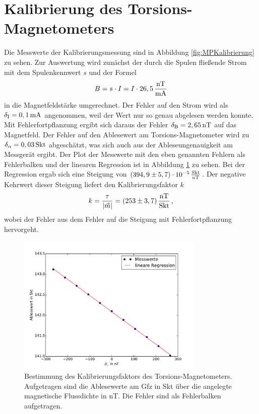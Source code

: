 \section{Kalibrierung des Torsions-Magnetometers}

Die Messwerte der Kalibrierungsmessung sind in Abbildung \ref{fig:MPKalibrierung} zu sehen. Zur Auswertung wird zunächst der durch die Spulen fließende Strom mit dem Spulenkennwert $s$ und der Formel
\begin{equation}
 B=s\cdot I=I\cdot 26,5\,\frac{\mathrm{nT}}{\mathrm{mA}} 
\end{equation}
in die Magnetfeldstärke umgerechnet. Der Fehler auf den Strom wird als $\delta_{\mathrm{I}}=0,1\,\mathrm{mA}$ angenommen, weil der Wert nur so genau abgelesen werden konnte. Mit Fehlerfortpflanzung ergibt sich daraus der Fehler $\delta_{\mathrm{B}}=2,65\,\mathrm{nT}$ auf das Magnetfeld. Der Fehler auf den Ablesewert am Torsions-Magnetometer wird zu $\delta_{\mathrm{\alpha}}=0,03\,\mathrm{Skt}$ abgeschätzt, was sich auch aus der Ableseungenauigkeit am Messgerät ergibt. Der Plot der Messwerte mit den eben genannten Fehlern als Fehlerbalken und der linearen Regression ist in Abbildung \ref{fig:kalibrierung} zu sehen. Bei der Regression ergab sich eine Steigung von $(394,9\pm5,7)\cdot 10^{-5}\,\frac{\mathrm{Skt}}{\mathrm{nT}}$. Der negative Kehrwert dieser Steigung liefert den Kalibrierungsfaktor $k$
\begin{equation}
 k=\frac{\tau}{|\vec{m}|}=(253\pm3,7)\,\frac{\mathrm{nT}}{\mathrm{Skt}} \text{\,,}
\end{equation}
wobei der Fehler aus dem Fehler auf die Steigung mit Fehlerfortpflanzung hervorgeht.

\begin{figure}[!ht]
 \centering
 \includegraphics[width=0.8\textwidth]{fig/kalibrierung}
 \caption[Bestimmung des Kalibrierungsfaktors des Torsions-Magnetometers]{Bestimmung des Kalibrierungsfaktors des Torsions-Magnetometers. Aufgetragen sind die Ablesewerte am Gfz in Skt über die angelegte magnetische Flussdichte in nT. Die Fehler sind als Fehlerbalken aufgetragen.}
 \label{fig:kalibrierung}
\end{figure}

